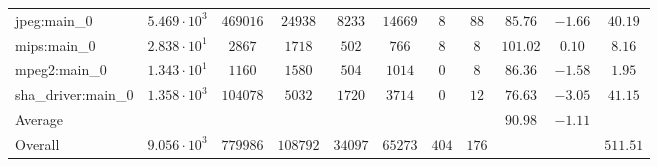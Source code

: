 \begin{tabular}{|l|c|c|c|c|c|c|c|c|c|c|}
jpeg:main\_0            & $ 5.469 \cdot 10^{3} $ & $ 469016 $ & $ 24938  $ & $ 8233  $ & $ 14669 $ & $ 8   $ & $ 88  $ & $ 85.76       $ & $ -1.66   $ & $ 40.19   $ \\
mips:main\_0            & $ 2.838 \cdot 10^{1} $ & $ 2867   $ & $ 1718   $ & $ 502   $ & $ 766   $ & $ 8   $ & $ 8   $ & $ 101.02      $ & $ 0.10    $ & $ 8.16    $ \\
mpeg2:main\_0           & $ 1.343 \cdot 10^{1} $ & $ 1160   $ & $ 1580   $ & $ 504   $ & $ 1014  $ & $ 0   $ & $ 8   $ & $ 86.36       $ & $ -1.58   $ & $ 1.95    $ \\
sha\_driver:main\_0     & $ 1.358 \cdot 10^{3} $ & $ 104078 $ & $ 5032   $ & $ 1720  $ & $ 3714  $ & $ 0   $ & $ 12  $ & $ 76.63       $ & $ -3.05   $ & $ 41.15   $ \\
\hline
Average                 & $                    $ & $        $ & $        $ & $       $ & $       $ & $     $ & $     $ & $ 90.98       $ & $ -1.11   $ & $         $ \\
\hline
Overall                 & $ 9.056 \cdot 10^{3} $ & $ 779986 $ & $ 108792 $ & $ 34097 $ & $ 65273 $ & $ 404 $ & $ 176 $ & $             $ & $         $ & $ 511.51  $ \\
\hline
\end{tabular}
